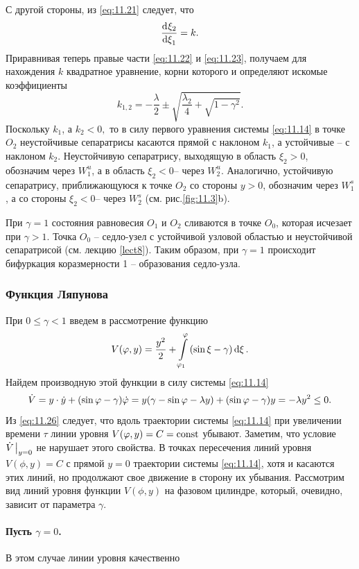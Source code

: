 С другой стороны, из \eqref{eq:11.21} следует, что
\begin{equation}
        \label{eq:11.23}
        \dv[]{\xi_{2}}{\xi_{1}} = k.
\end{equation}
Приравнивая теперь правые части \eqref{eq:11.22} и \eqref{eq:11.23}, получаем для
нахождения $k$ квадратное уравнение, корни которого и определяют искомые 
коэффициенты
\begin{equation}
        \label{eq:11.24}
        k_{1,2} = - \frac{\lambda}{2} \pm \sqrt{ \frac{\lambda_{2}}{4} + \sqrt{ 1 - \gamma^2}}.
\end{equation}
Поскольку $k_{1}$, а $k_{2}<0,$ то в силу первого уравнения системы \eqref{eq:11.14}
в точке $O_{2}$ неустойчивые сепаратрисы касаются прямой с наклоном $k_{1}$, а устойчивые --
с наклоном $k_{2}$. Неустойчивую сепаратрису, выходящую в область $\xi_{2}>0$, обозначим через
$W_{1}^u$, а в область $\xi_{2}<0$-- через $W_{2}^u$. Аналогично, устойчивую сепаратрису,
приближающуюся к точке $O_{2}$ со стороны $y>0$, обозначим через
$W_{1}^s$, а со стороны $\xi_{2}<0$-- через $W_{2}^s$ (см. рис.\ref{fig:11.3}b).

При $\gamma=1$ состояния равновесия $O_{1}$ и $O_{2}$ сливаются в точке $O_{0}$,
которая исчезает при $\gamma>1$. Точка $O_{0}$ -- седло-узел с устойчивой 
узловой областью и неустойчивой сепаратрисой (см. лекцию \ref{lect8}). Таким
образом, при  $\gamma=1$ происходит бифуркация коразмерности 1  -- образования 
седло-узла.

 
\subsubsection{Функция Ляпунова}%
\label{ssub:11.3.2c}

При $0\leq \gamma<1$ введем в рассмотрение функцию
\begin{equation}
        \label{eq:11.25}
        V( \varphi,y) = \frac{y^2}{2} + \int\limits_{\varphi_{1}}^{\varphi} \qty( \sin \xi - \gamma) \dd{\xi}. 
\end{equation}
Найдем производную 
этой функции в силу системы \eqref{eq:11.14}
\begin{equation}
        \label{eq:11.26}
        \dot V = y \cdot \dot y + \qty( \sin \varphi - \gamma) \dot {\varphi} =
        y\qty(\gamma - \sin \varphi - \lambda y) + (\sin \varphi -\gamma)y = - \lambda y^2 \leq 0.
\end{equation}
Из \eqref{eq:11.26} следует, что вдоль траектории системы \eqref{eq:11.14} при увеличении времени
$\tau$ линии уровня $V(\varphi,y) = C = \textrm{const}$ убывают.
Заметим, что условие $\dot V \eval_{y=0}$ не нарушает этого свойства.
В точках пересечения линий уровня $V(\phi,y) = C$ с прямой $y=0$ траектории системы \eqref{eq:11.14},
хотя и касаются этих линий, но продолжают свое движение в сторону их 
убывания. Рассмотрим вид линий уровня функции $V(\phi,y)$ на фазовом цилиндре, который,
очевидно, зависит от параметра $\gamma$.

\paragraph{Пусть $\gamma=0$.}%

В этом случае линии уровня качественно





                
